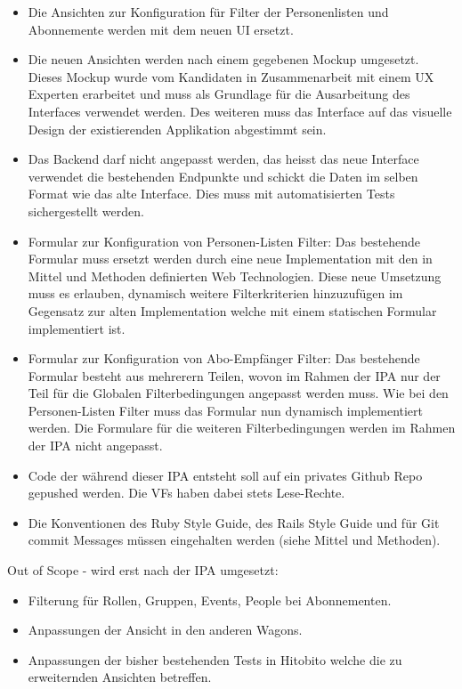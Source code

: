 \begin{itemize}
    \item Die Ansichten zur Konfiguration für Filter der Personenlisten und Abonnemente werden mit dem neuen UI ersetzt.
    \item Die neuen Ansichten werden nach einem gegebenen Mockup umgesetzt. Dieses Mockup wurde vom Kandidaten in Zusammenarbeit mit einem UX Experten erarbeitet und muss als Grundlage für die Ausarbeitung des Interfaces verwendet werden. Des weiteren muss das Interface auf das visuelle Design der existierenden Applikation abgestimmt sein.
    \item Das Backend darf nicht angepasst werden, das heisst das neue Interface verwendet die bestehenden Endpunkte und schickt die Daten im selben Format wie das alte Interface. Dies muss mit automatisierten Tests sichergestellt werden.
    \item Formular zur Konfiguration von Personen-Listen Filter: Das bestehende Formular muss ersetzt werden durch eine neue Implementation mit den in Mittel und Methoden definierten Web Technologien. Diese neue Umsetzung muss es erlauben, dynamisch weitere Filterkriterien hinzuzufügen im Gegensatz zur alten Implementation welche mit einem statischen Formular implementiert ist.
    \item Formular zur Konfiguration von Abo-Empfänger Filter: Das bestehende Formular besteht aus mehrerern Teilen, wovon im Rahmen der IPA nur der Teil für die Globalen Filterbedingungen angepasst werden muss. Wie bei den Personen-Listen Filter muss das Formular nun dynamisch implementiert werden. Die Formulare für die weiteren Filterbedingungen werden im Rahmen der IPA nicht angepasst. 
    \item Code der während dieser IPA entsteht soll auf ein privates Github Repo gepushed werden. Die VFs haben dabei stets Lese-Rechte.
    \item Die Konventionen des Ruby Style Guide, des Rails Style Guide und für Git commit Messages müssen eingehalten werden (siehe Mittel und Methoden).
\end{itemize}

\newpage

Out of Scope - wird erst nach der IPA umgesetzt:

\begin{itemize}
    \item Filterung für Rollen, Gruppen, Events, People bei Abonnementen.
    \item Anpassungen der Ansicht in den anderen Wagons.
    \item Anpassungen der bisher bestehenden Tests in Hitobito welche die zu erweiternden Ansichten betreffen.
\end{itemize}

